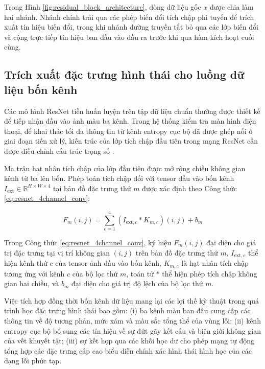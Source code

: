 Trong Hình \ref{fig:residual_block_architecture}, dòng dữ liệu gốc $x$ được chia làm hai nhánh. Nhánh chính trải qua các phép biến đổi tích chập phi tuyến để trích xuất tín hiệu biến đổi, trong khi nhánh đường truyền tắt bỏ qua các lớp biến đổi và cộng trực tiếp tín hiệu ban đầu vào đầu ra trước khi qua hàm kích hoạt cuối cùng.

\subsection{Trích xuất đặc trưng hình thái cho luồng dữ liệu bốn kênh}

Các mô hình ResNet tiền huấn luyện trên tập dữ liệu chuẩn thường được thiết kế để tiếp nhận đầu vào ảnh màu ba kênh. Trong hệ thống kiểm tra màn hình điện thoại, để khai thác tối đa thông tin từ kênh entropy cục bộ đã được ghép nối ở giai đoạn tiền xử lý, kiến trúc của lớp tích chập đầu tiên trong mạng ResNet cần được điều chỉnh cấu trúc trọng số \cite{szegedy2016rethinking}.

Ma trận hạt nhân tích chập của lớp đầu tiên được mở rộng chiều không gian kênh từ ba lên bốn. Phép toán tích chập đối với tensor đầu vào bốn kênh $I_{\text{ext}} \in \mathbb{R}^{H \times W \times 4}$ tại bản đồ đặc trưng thứ $m$ được xác định theo Công thức \ref{eq:resnet_4channel_conv}:

\begin{equation}
F_m(i,j) = \sum_{c=1}^{4} \left( I_{\text{ext}, c} * K_{m,c} \right)(i,j) + b_m
\label{eq:resnet_4channel_conv}
\end{equation}

Trong Công thức \ref{eq:resnet_4channel_conv}, ký hiệu $F_m(i,j)$ đại diện cho giá trị đặc trưng tại vị trí không gian $(i,j)$ trên bản đồ đặc trưng thứ $m$, $I_{\text{ext}, c}$ thể hiện kênh thứ $c$ của tensor ảnh đầu vào bốn kênh, $K_{m,c}$ là hạt nhân tích chập tương ứng với kênh $c$ của bộ lọc thứ $m$, toán tử $*$ thể hiện phép tích chập không gian hai chiều, và $b_m$ đại diện cho giá trị độ lệch của bộ lọc thứ $m$.

Việc tích hợp đồng thời bốn kênh dữ liệu mang lại các lợi thế kỹ thuật trong quá trình học đặc trưng hình thái bao gồm:
(i) ba kênh màu ban đầu cung cấp các thông tin về độ tương phản, mức xám và màu sắc tổng thể của vùng lỗi;
(ii) kênh entropy cục bộ bổ sung các tín hiệu về sự đứt gãy kết cấu và biên giới không gian của vết khuyết tật;
(iii) sự kết hợp qua các khối học dư cho phép mạng tự động tổng hợp các đặc trưng cấp cao biểu diễn chính xác hình thái hình học của các dạng lỗi phức tạp.

